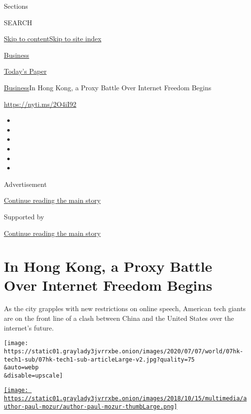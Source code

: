 Sections

SEARCH

\protect\hyperlink{site-content}{Skip to
content}\protect\hyperlink{site-index}{Skip to site index}

\href{https://www.nytimes3xbfgragh.onion/section/business}{Business}

\href{https://myaccount.nytimes3xbfgragh.onion/auth/login?response_type=cookie\&client_id=vi}{}

\href{https://www.nytimes3xbfgragh.onion/section/todayspaper}{Today's
Paper}

\href{/section/business}{Business}\textbar{}In Hong Kong, a Proxy Battle
Over Internet Freedom Begins

\url{https://nyti.ms/2O4iI92}

\begin{itemize}
\item
\item
\item
\item
\item
\item
\end{itemize}

Advertisement

\protect\hyperlink{after-top}{Continue reading the main story}

Supported by

\protect\hyperlink{after-sponsor}{Continue reading the main story}

\hypertarget{in-hong-kong-a-proxy-battle-over-internet-freedom-begins}{%
\section{In Hong Kong, a Proxy Battle Over Internet Freedom
Begins}\label{in-hong-kong-a-proxy-battle-over-internet-freedom-begins}}

As the city grapples with new restrictions on online speech, American
tech giants are on the front line of a clash between China and the
United States over the internet's future.

\texttt{[image: https://static01.graylady3jvrrxbe.onion/images/2020/07/07/world/07hk-tech1-sub/07hk-tech1-sub-articleLarge-v2.jpg?quality=75\\\&auto=webp\\\&disable=upscale]}

\href{https://www.nytimes3xbfgragh.onion/by/paul-mozur}{\texttt{[image: https://static01.graylady3jvrrxbe.onion/images/2018/10/15/multimedia/author-paul-mozur/author-paul-mozur-thumbLarge.png]}}

